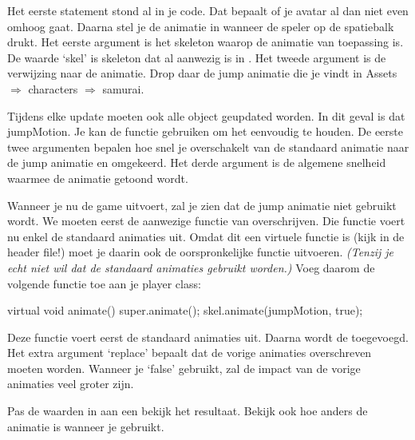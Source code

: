 Het eerste statement stond al in je code. Dat bepaalt of je avatar al dan niet even omhoog gaat. Daarna stel je de animatie in wanneer de speler op de spatiebalk drukt. Het eerste argument is het skeleton waarop de animatie van toepassing is. De waarde `skel' is skeleton dat al aanwezig is in . Het tweede argument is de verwijzing naar de animatie. Drop daar de jump animatie die je vindt in Assets $\Rightarrow$ characters  $\Rightarrow$ samurai.

Tijdens elke update moeten ook alle  object geupdated worden. In dit geval is dat jumpMotion. Je kan de  functie gebruiken om het eenvoudig te houden. De eerste twee argumenten bepalen hoe snel je overschakelt van de standaard animatie naar de jump animatie en omgekeerd. Het derde argument is de algemene snelheid waarmee de animatie getoond wordt.

Wanneer je nu de game uitvoert, zal je zien dat de jump animatie niet gebruikt wordt. We moeten eerst de aanwezige functie  van  overschrijven. Die functie voert nu enkel de standaard animaties uit. Omdat dit een virtuele functie is (kijk in de header file!) moet je daarin ook de oorspronkelijke functie uitvoeren. \textit{(Tenzij je echt niet wil dat de standaard animaties gebruikt worden.)} Voeg daarom de volgende functie toe aan je player class:

\begin{code}
virtual void animate()
{
  super.animate();
  skel.animate(jumpMotion, true);
}
\end{code}

Deze functie voert eerst de standaard animaties uit. Daarna wordt de  toegevoegd. Het extra argument `replace' bepaalt dat de vorige animaties overschreven moeten worden. Wanneer je `false' gebruikt, zal de impact van de vorige animaties veel groter zijn.

\begin{exercise}
Pas de waarden in  aan een bekijk het resultaat. Bekijk ook hoe anders de animatie is wanneer je  gebruikt.
\end{exercise}

